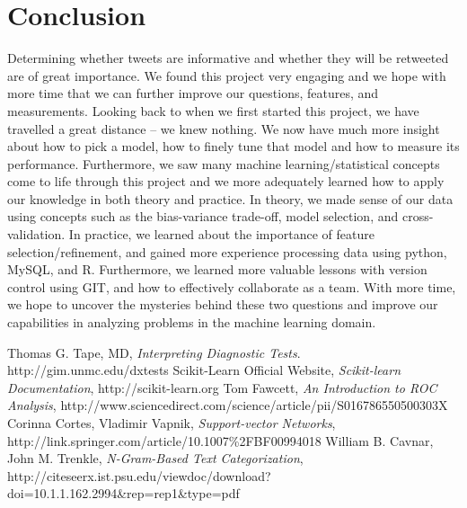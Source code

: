 \documentclass[12pt]{article}
\begin{document}
\section{Conclusion}
Determining whether tweets are informative and whether they will be retweeted are of great importance. We found this project very engaging and we hope with more time that we can further improve our questions, features, and measurements.  Looking back to when we first started this project, we have travelled a great distance -- we knew nothing. We now have much more insight about how to pick a model, how to finely tune that model and how to measure its performance. Furthermore, we saw many machine learning/statistical concepts come to life through this project and we more adequately learned how to apply our knowledge in both theory and practice. In theory, we made sense of our data using concepts such as the bias-variance trade-off, model selection, and cross-validation. In practice, we learned about the importance of feature selection/refinement, and gained more experience processing data using python, MySQL, and R. Furthermore, we learned more valuable lessons with version control using GIT, and how to effectively collaborate as a team. With more time, we hope to uncover the mysteries behind these two questions and improve our capabilities in analyzing problems in the machine learning domain.
\begin{thebibliography}{4}
    Thomas G. Tape, MD,
    \emph{Interpreting Diagnostic Tests}. 
    http://gim.unmc.edu/dxtests
    Scikit-Learn Official Website,
    \emph{Scikit-learn Documentation},
    http://scikit-learn.org
    Tom Fawcett,
    \emph{An Introduction to ROC Analysis},
    http://www.sciencedirect.com/science/article/pii/S016786550500303X
    Corinna Cortes, Vladimir Vapnik,
    \emph{Support-vector Networks},
    http://link.springer.com/article/10.1007\%2FBF00994018
    William B. Cavnar, John M. Trenkle,
    \emph{N-Gram-Based Text Categorization},
    http://citeseerx.ist.psu.edu/viewdoc/download?doi=10.1.1.162.2994\&rep=rep1\&type=pdf
\end{thebibliography}
\end{document}
